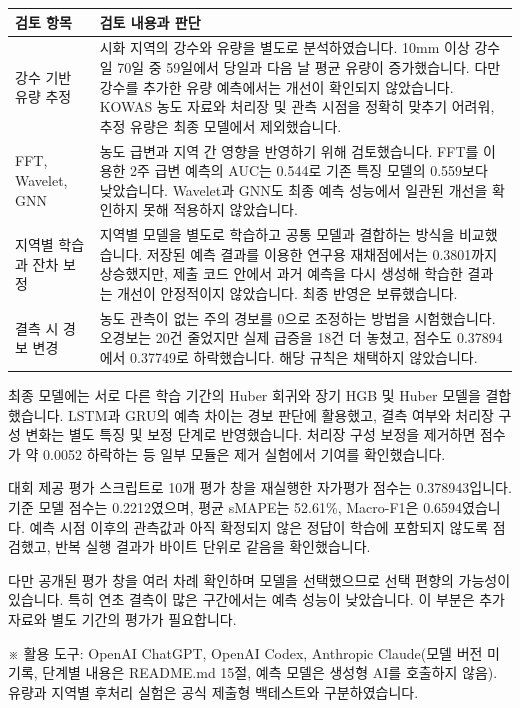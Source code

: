 \documentclass[10pt]{article}
\newcommand{\hy}{{\hyfont -}}
\newcommand{\sect}[1]{\par\vspace{8pt}{\fontsize{12.6}{15}\selectfont\bfseries #1\par}\nointerlineskip\vspace{4pt}\noindent{\color[gray]{0.2}\rule{\textwidth}{0.4pt}}\par\nointerlineskip\vspace{4pt}}
\begin{document}
\sect{2. 주요 대안과 검토 결과}
{\fontsize{8.8}{11.5}\selectfont
\renewcommand{\arraystretch}{1.35}
\begin{tabularx}{\textwidth}{>{\raggedright\arraybackslash}p{36mm}>{\raggedright\arraybackslash}X}
\rowcolor{head}\textbf{검토 항목} & \textbf{검토 내용과 판단}\\ \hline
강수 기반 유량 추정 & 시화 지역의 강수와 유량을 별도로 분석하였습니다. 10mm 이상 강수일 70일 중 59일에서 당일과 다음 날 평균 유량이 증가했습니다. 다만 강수를 추가한 유량 예측에서는 개선이 확인되지 않았습니다. KOWAS 농도 자료와 처리장 및 관측 시점을 정확히 맞추기 어려워, 추정 유량은 최종 모델에서 제외했습니다.\\ \hline
FFT, Wavelet, GNN & 농도 급변과 지역 간 영향을 반영하기 위해 검토했습니다. FFT를 이용한 2주 급변 예측의 AUC는 0.544로 기존 특징 모델의 0.559보다 낮았습니다. Wavelet과 GNN도 최종 예측 성능에서 일관된 개선을 확인하지 못해 적용하지 않았습니다.\\ \hline
지역별 학습과 잔차 보정 & 지역별 모델을 별도로 학습하고 공통 모델과 결합하는 방식을 비교했습니다. 저장된 예측 결과를 이용한 연구용 재채점에서는 0.3801까지 상승했지만, 제출 코드 안에서 과거 예측을 다시 생성해 학습한 결과는 개선이 안정적이지 않았습니다. 최종 반영은 보류했습니다.\\ \hline
결측 시 경보 변경 & 농도 관측이 없는 주의 경보를 0으로 조정하는 방법을 시험했습니다. 오경보는 20건 줄었지만 실제 급증을 18건 더 놓쳤고, 점수도 0.37894에서 0.37749로 하락했습니다. 해당 규칙은 채택하지 않았습니다.\\ \hline
\end{tabularx}}

\sect{3. 최종 선택과 검증}
최종 모델에는 서로 다른 학습 기간의 Huber 회귀와 장기 HGB 및 Huber 모델을 결합했습니다. LSTM과 GRU의 예측 차이는 경보 판단에 활용했고, 결측 여부와 처리장 구성 변화는 별도 특징 및 보정 단계로 반영했습니다. 처리장 구성 보정을 제거하면 점수가 약 0.0052 하락하는 등 일부 모듈은 제거 실험에서 기여를 확인했습니다.

\vspace{3pt}
대회 제공 평가 스크립트로 10개 평가 창을 재실행한 자가평가 점수는 0.378943입니다. 기준 모델 점수는 0.2212였으며, 평균 sMAPE는 52.61\%, Macro\hy{}F1은 0.6594였습니다. 예측 시점 이후의 관측값과 아직 확정되지 않은 정답이 학습에 포함되지 않도록 점검했고, 반복 실행 결과가 바이트 단위로 같음을 확인했습니다.

\vspace{3pt}
다만 공개된 평가 창을 여러 차례 확인하며 모델을 선택했으므로 선택 편향의 가능성이 있습니다. 특히 연초 결측이 많은 구간에서는 예측 성능이 낮았습니다. 이 부분은 추가 자료와 별도 기간의 평가가 필요합니다.

\vspace{4pt}
{\fontsize{7.5}{9.5}\selectfont\color{note} ※ 활용 도구: OpenAI ChatGPT, OpenAI Codex, Anthropic Claude(모델 버전 미기록, 단계별 내용은 README.md 15절, 예측 모델은 생성형 AI를 호출하지 않음). 유량과 지역별 후처리 실험은 공식 제출형 백테스트와 구분하였습니다.}
\end{document}
